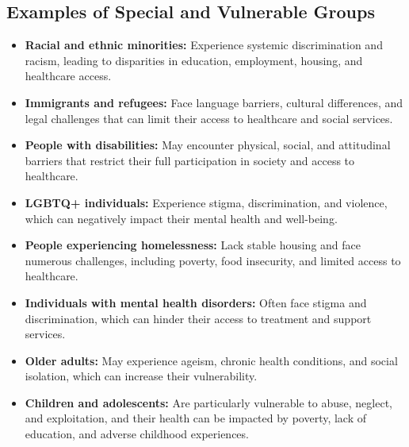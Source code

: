 \documentclass[12pt,a4paper]{article}
\begin{document}
\subsection*{Examples of Special and Vulnerable Groups}
\begin{itemize}
    \item \textbf{Racial and ethnic minorities:} Experience systemic discrimination and racism, leading to disparities in education, employment, housing, and healthcare access.
    \item \textbf{Immigrants and refugees:} Face language barriers, cultural differences, and legal challenges that can limit their access to healthcare and social services.
    \item \textbf{People with disabilities:} May encounter physical, social, and attitudinal barriers that restrict their full participation in society and access to healthcare.
    \item \textbf{LGBTQ+ individuals:} Experience stigma, discrimination, and violence, which can negatively impact their mental health and well-being.
    \item \textbf{People experiencing homelessness:} Lack stable housing and face numerous challenges, including poverty, food insecurity, and limited access to healthcare.
    \item \textbf{Individuals with mental health disorders:} Often face stigma and discrimination, which can hinder their access to treatment and support services.
    \item \textbf{Older adults:} May experience ageism, chronic health conditions, and social isolation, which can increase their vulnerability.
    \item \textbf{Children and adolescents:} Are particularly vulnerable to abuse, neglect, and exploitation, and their health can be impacted by poverty, lack of education, and adverse childhood experiences.
\end{itemize}
\end{document}
